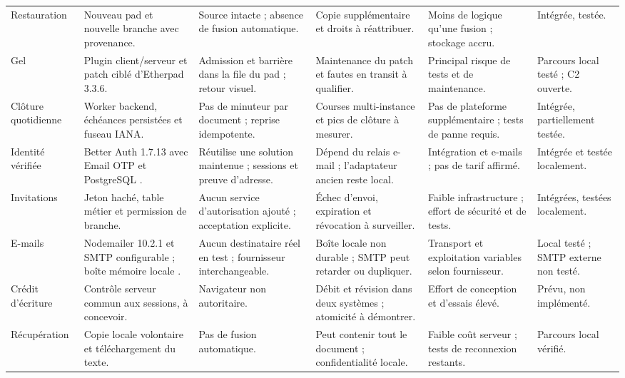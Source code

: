\begin{longtable}{@{}L{21mm}@{\hspace{1mm}}L{28mm}@{\hspace{1mm}}L{29mm}@{\hspace{1mm}}L{27mm}@{\hspace{1mm}}L{24mm}@{\hspace{1mm}}L{17mm}@{}}
\addlinespace
Restauration & Nouveau pad et nouvelle branche avec provenance. & Source intacte ; absence de fusion automatique. & Copie supplémentaire et droits à réattribuer. & Moins de logique qu'une fusion ; stockage accru. & Intégrée, testée. \\
\addlinespace
Gel & Plugin client/serveur et patch ciblé d'Etherpad 3.3.6. & Admission et barrière dans la file du pad ; retour visuel. & Maintenance du patch et fautes en transit à qualifier. & Principal risque de tests et de maintenance. & Parcours local testé ; C2 ouverte. \\
\addlinespace
Clôture quotidienne & Worker backend, échéances persistées et fuseau IANA. & Pas de minuteur par document ; reprise idempotente. & Courses multi-instance et pics de clôture à mesurer. & Pas de plateforme supplémentaire ; tests de panne requis. & Intégrée, partiellement testée. \\
\addlinespace
Identité vérifiée & Better Auth 1.7.13 avec Email OTP et PostgreSQL \cite{better-auth-otp,better-auth-fastify,better-auth-postgres}. & Réutilise une solution maintenue ; sessions et preuve d'adresse. & Dépend du relais e-mail ; l'adaptateur ancien reste local. & Intégration et e-mails ; pas de tarif affirmé. & Intégrée et testée localement. \\
\addlinespace
Invitations & Jeton haché, table métier et permission de branche. & Aucun service d'autorisation ajouté ; acceptation explicite. & Échec d'envoi, expiration et révocation à surveiller. & Faible infrastructure ; effort de sécurité et de tests. & Intégrées, testées localement. \\
\addlinespace
E-mails & Nodemailer 10.2.1 et SMTP configurable ; boîte mémoire locale \cite{nodemailer-doc}. & Aucun destinataire réel en test ; fournisseur interchangeable. & Boîte locale non durable ; SMTP peut retarder ou dupliquer. & Transport et exploitation variables selon fournisseur. & Local testé ; SMTP externe non testé. \\
\addlinespace
Crédit d'écriture & Contrôle serveur commun aux sessions, à concevoir. & Navigateur non autoritaire. & Débit et révision dans deux systèmes ; atomicité à démontrer. & Effort de conception et d'essais élevé. & Prévu, non implémenté. \\
\addlinespace
Récupération & Copie locale volontaire et téléchargement du texte. & Pas de fusion automatique. & Peut contenir tout le document ; confidentialité locale. & Faible coût serveur ; tests de reconnexion restants. & Parcours local vérifié. \\

\end{longtable}

